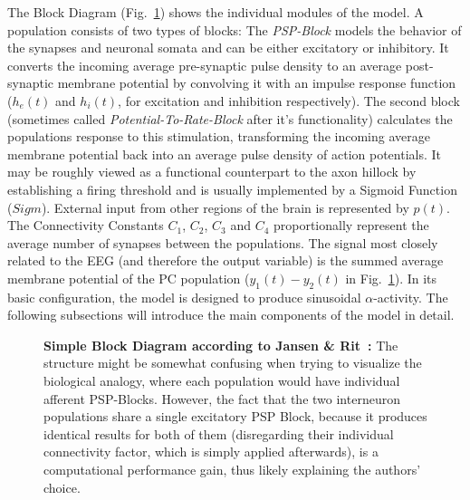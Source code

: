 The Block Diagram (Fig.~\ref{fig:Jansen Rit Simple}) shows the individual modules of the model.
A population consists of two types of blocks:
The \textit{PSP-Block} models the behavior of the synapses and neuronal somata
and can be either excitatory or inhibitory.
It converts the incoming average pre-synaptic pulse density to
an average post-synaptic membrane potential by convolving it with an
impulse response function ($h_e(t)$ and $h_i(t)$, for excitation and inhibition respectively).
The second block (sometimes called \textit{Potential-To-Rate-Block} after it's functionality)
calculates the populations response to this stimulation, transforming the incoming
average membrane potential back into an average pulse density of action potentials.
It may be roughly viewed as a functional counterpart to the axon hillock by establishing a firing threshold
and is usually implemented by a Sigmoid Function ($Sigm$).
External input from other regions of the brain is represented by $p(t)$.
The Connectivity Constants $C_1$, $C_2$, $C_3$ and $C_4$ proportionally represent the
average number of synapses between the populations.
The signal most closely related to the EEG (and therefore the output variable)
is the summed average membrane potential of the PC population ($y_1(t)-y_2(t)$ in Fig.~\ref{fig:Jansen Rit Simple}).
In its basic configuration, the model is designed to produce sinusoidal $\alpha$-activity.
The following subsections will introduce the main components of the model in detail.

\begin{figure}[H]
    \centering
    
    \caption{\textbf{Simple Block Diagram according to Jansen \& Rit~\cite{jansen_electroencephalogram_1995}:}
    The structure might be somewhat confusing when trying to visualize the biological analogy,
        where each population would have individual afferent PSP-Blocks.
        However, the fact that the two interneuron populations share a single excitatory PSP Block,
        because it produces identical results for both of them (disregarding their individual connectivity factor,
        which is simply applied afterwards), is a computational performance gain,
        thus likely explaining the authors' choice.}
    \label{fig:Jansen Rit Simple}
\end{figure}

